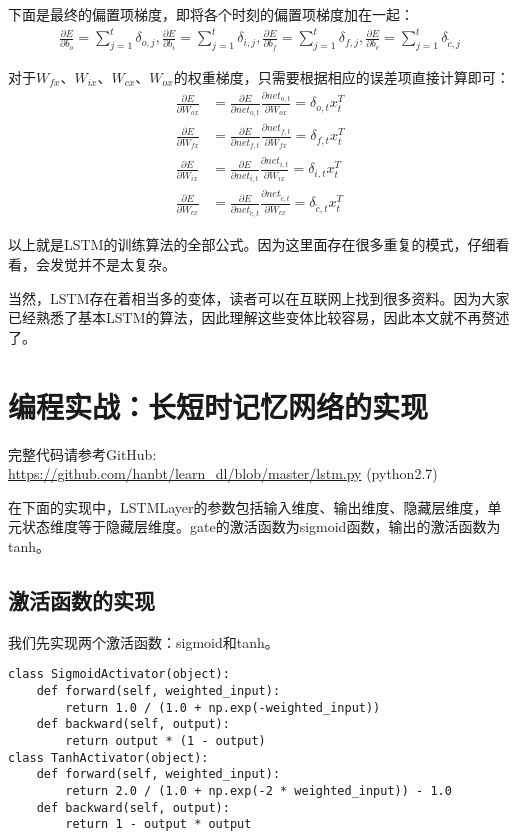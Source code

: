 下面是最终的偏置项梯度，即将各个时刻的偏置项梯度加在一起：
\begin{align*}
	\frac{\partial{E}}{\partial{{b}_o}}=\sum_{j=1}^t\delta_{o,j},
	\frac{\partial{E}}{\partial{{b}_i}}=\sum_{j=1}^t\delta_{i,j},
	\frac{\partial{E}}{\partial{{b}_f}}=\sum_{j=1}^t\delta_{f,j},
	\frac{\partial{E}}{\partial{{b}_c}}=\sum_{j=1}^t\delta_{\tilde{c},j}
\end{align*}

对于\(W_{fx}\)、\(W_{ix}\)、\(W_{cx}\)、\(W_{ox}\)的权重梯度，只需要根据相应的误差项直接计算即可：
\begin{align*}
	\frac{\partial{E}}{\partial{W_{ox}}} & =\frac{\partial{E}}{\partial{{net}_{o,t}}}\frac{\partial{{net}_{o,t}}}{\partial{W_{ox}}}=\delta_{o,t}{x}_{t}^T                         \\
	\frac{\partial{E}}{\partial{W_{fx}}} & =\frac{\partial{E}}{\partial{{net}_{f,t}}}\frac{\partial{{net}_{f,t}}}{\partial{W_{fx}}}=\delta_{f,t}{x}_{t}^T                         \\
	\frac{\partial{E}}{\partial{W_{ix}}} & =\frac{\partial{E}}{\partial{{net}_{i,t}}}\frac{\partial{{net}_{i,t}}}{\partial{W_{ix}}}=\delta_{i,t}{x}_{t}^T                         \\
	\frac{\partial{E}}{\partial{W_{cx}}} & =\frac{\partial{E}}{\partial{{net}_{\tilde{c},t}}}\frac{\partial{{net}_{\tilde{c},t}}}{\partial{W_{cx}}}=\delta_{\tilde{c},t}{x}_{t}^T
\end{align*}

以上就是LSTM的训练算法的全部公式。因为这里面存在很多重复的模式，仔细看看，会发觉并不是太复杂。

当然，LSTM存在着相当多的变体，读者可以在互联网上找到很多资料。因为大家已经熟悉了基本LSTM的算法，因此理解这些变体比较容易，因此本文就不再赘述了。




\section{编程实战：长短时记忆网络的实现}\label{Lstm:9}

\begin{note}
	完整代码请参考GitHub: \url{https://github.com/hanbt/learn_dl/blob/master/lstm.py}
	(python2.7)
\end{note}

在下面的实现中，LSTMLayer的参数包括输入维度、输出维度、隐藏层维度，单元状态维度等于隐藏层维度。gate的激活函数为sigmoid函数，输出的激活函数为tanh。

\subsection{激活函数的实现}\label{Lstm:10}
我们先实现两个激活函数：sigmoid和tanh。
\begin{lstlisting}
class SigmoidActivator(object):
    def forward(self, weighted_input):
        return 1.0 / (1.0 + np.exp(-weighted_input))
    def backward(self, output):
        return output * (1 - output)
class TanhActivator(object):
    def forward(self, weighted_input):
        return 2.0 / (1.0 + np.exp(-2 * weighted_input)) - 1.0
    def backward(self, output):
        return 1 - output * output
\end{lstlisting}


